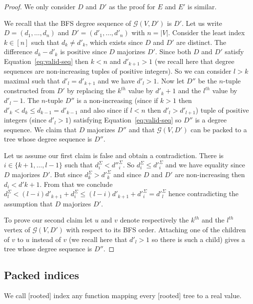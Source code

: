 \documentclass[11 pt]{modarticle}
\newcommand{\size}[1]{|#1|}
\newcommand{\greedy}[2]{\mathcal{G}(#1,#2)}
\begin{document}
\begin{proof}
We only consider $D$ and $D'$ as the proof for $E$ and $E'$ is similar.

We recall that the BFS degree sequence of $\greedy{V}{D'}$ is $D'$. Let us write $D = (d_1, \dots, d_n)$ and $D' = (d'_1, \dots, d'_n)$ with $n = \size{V}$. Consider the least index $k \in [n]$ such that $d_k \neq d'_k$, which exists since $D$ and $D'$ are distinct. The difference $d_k - d'_k$ is positive since $D$ majorizes $D'$. Since both $D$ and $D'$ satisfy Equation~\eqref{eq:valid-seq} then $k < n$ and $d'_{k+1} > 1$ (we recall here that degree sequences are non-increasing tuples of positive integers). So we can consider $l > k$ maximal such that $d'_l = d'_{k+1}$ and we have $d'_l > 1$. Now let $D''$ be the $n$-tuple constructed from $D'$ by replacing the $k^{th}$ value by $d'_k+1$ and the $l^{th}$ value by $d'_l-1$. The $n$-tuple $D''$ is a non-increasing (since if $k > 1$ then $d'_k < d_k \leq d_{k-1} = d'_{k-1}$ and also since if $l < n$ then $d'_l > d'_{l+1}$) tuple of positive integers (since $d'_l > 1$) satisfying Equation~\eqref{eq:valid-seq} so $D''$ is a degree sequence. We claim that $D$ majorizes $D''$ and that $\greedy{V}{D'}$ can be packed to a tree whose degree sequence is $D''$.

Let us assume our first claim is false and obtain a contradiction. There is $i \in \{k+1, \dots, l-1\}$ such that $d^{\Sigma}_i < d''^{\Sigma}_i$. So $d^{\Sigma}_i \leq d'^{\Sigma}_i$ and we have equality since $D$ majorizes $D'$. But since $d^{\Sigma}_k > d'^{\Sigma}_k$ and since $D$ and $D'$ are non-increasing then $d_i < d'{k+1}$.  From that we conclude $d^{\Sigma}_l < (l-i) d'_{k+1} + d^{\Sigma}_i \leq (l-i) d'_{k+1} + d'^{\Sigma}_i = d'^{\Sigma}_l$ hence contradicting the assumption that $D$ majorizes $D'$. 

To prove our second claim let $u$ and $v$ denote respectively the $k^{th}$ and the $l^{th}$ vertex of $\greedy{V}{D'}$ with respect to its BFS order. Attaching one of the children of $v$ to $u$ instead of $v$ (we recall here that $d'_l > 1$ so there is such a child) gives a tree whose degree sequence is $D''$.
\end{proof}

\subsection{Packed indices}

We call [rooted] index any function mapping every [rooted] tree to a real value.
\end{document}
